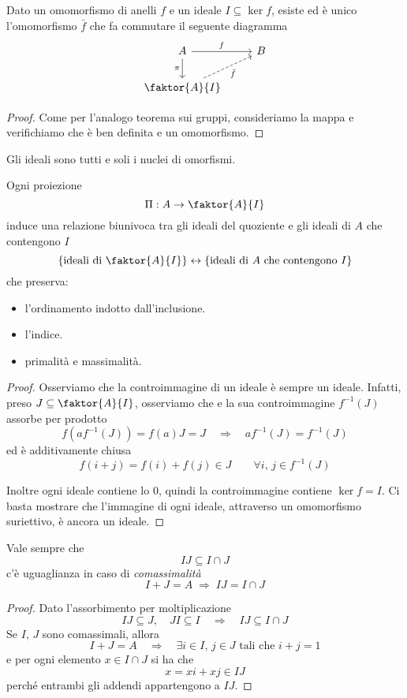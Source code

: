 \begin{multicols}{2}
\begin{theorem}[di omomorfismo]\label{omoanelli}
	Dato un omomorfismo di anelli $ f $ e un ideale $ I \subseteq \ker f $, esiste ed è unico l'omomorfismo $ \bar{f} $ che fa commutare il seguente diagramma
	\[ \begin{tikzcd}
	A \arrow{r}{f} \arrow[swap]{d}{\pi} & B \\
	\faktor{A}{I} \arrow[swap, dashed]{ru}{\bar{f}}
	\end{tikzcd} \]
\end{theorem}
\begin{proof}
	Come per l'analogo teorema sui gruppi, consideriamo la mappa
	e verifichiamo che è ben definita e un omomorfismo.
\end{proof}
\begin{remark}
	Gli ideali sono tutti e soli i nuclei di omorfismi.
\end{remark}

\begin{theorem}[di corrispondenza]\label{corr}
	Ogni proiezione $$  \Pi : A \to \faktor{A}{I}  $$ induce una relazione biunivoca tra gli ideali del quoziente e gli ideali di $ A $ che contengono $ I $
	\[ \{ \text{ideali di }\faktor{A}{I} \} \leftrightarrow \{ \text{ideali di $ A $ che contengono $ I $} \} \]
	che preserva:
	\begin{itemize}
		\item l'ordinamento indotto dall'inclusione.
		\item l'indice.
		\item primalità e massimalità.
	\end{itemize}
\end{theorem}
\begin{proof}
	Osserviamo che la controimmagine di un ideale è sempre un ideale. Infatti, preso $ J \subseteq \faktor{A}{I} $, osserviamo che e la sua controimmagine $ f^{-1}(J) $ assorbe per prodotto
	\[ f(af^{-1}(J)) = f(a)J = J \quad\Rightarrow\quad af^{-1}(J) = f^{-1}(J)  \]
	ed è additivamente chiusa
	\[ f(i + j) = f(i) + f(j) \in J \qquad \forall i, \, j \in f^{-1}(J) \]
	
	Inoltre ogni ideale contiene lo $ 0 $, quindi la controimmagine contiene $ \ker f = I $. Ci basta mostrare che l'immagine di ogni ideale, attraverso un omomorfismo suriettivo, è ancora un ideale.
\end{proof}
\begin{remark}
	Vale sempre che
	\[ IJ \subseteq I \cap J \]
	c'è uguaglianza in caso di \emph{comassimalità}
	\[ I + J = A \;\Rightarrow\; IJ = I \cap J \]
\end{remark}
\begin{proof}
	Dato l'assorbimento per moltiplicazione
	\[ IJ \subseteq J, \quad JI \subseteq I \quad\Rightarrow\quad IJ \subseteq I \cap J  \]
	Se $ I $, $ J $ sono comassimali, allora
	\[ I + J = A \quad\Rightarrow\quad \exists i \in I, \, j \in J \text{ tali che } i + j = 1 \]
	e per ogni elemento $ x \in I \cap J $ si ha che
	\[ x = xi + xj \in IJ \]
	perché entrambi gli addendi appartengono a $ IJ $.
\end{proof}


\end{multicols}
